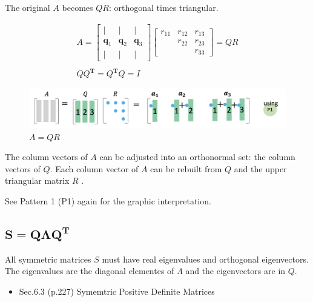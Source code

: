 \documentclass[letterpaper]{article}
\begin{document}
The original $A$ becomes $QR$: orthogonal times triangular.

\begin{gather*}
  A = 
  \begin{bmatrix}
    | & | & |\\
    \bm{q}_1 & \bm{q}_2 & \bm{q}_3\\
    | & | & |
  \end{bmatrix}
  \begin{bmatrix}
    r_{11} & r_{12} & r_{13}\\
           & r_{22} & r_{23}\\
           &        & r_{33}
  \end{bmatrix} = QR\\
  \\
  Q Q^\mathbf{T}=Q^\mathbf{T} Q = I
\end{gather*}

\begin{figure}[H]
  \includegraphics[keepaspectratio, width=\linewidth]{QR.png}
  \caption{$A=QR$}
\end{figure}

The column vectors of $A$ can be adjusted into an orthonormal set: the column vectors of $Q$.
Each column vector of $A$ can be rebuilt from $Q$ and the upper triangular matrix $R$ .

See Pattern 1 (P1) again for the graphic interpretation.


\clearpage

\subsection{$\boldsymbol{S=Q \Lambda Q^\mathbf{T}}$}

All symmetric matrices $S$ must have real eigenvalues and orthogonal eigenvectors.
The eigenvalues are the diagonal elementes of $\Lambda$ and the eigenvectors are in $Q$. 

\begin{itemize}
  \item Sec.6.3 (p.227) Symemtric Positive Definite Matrices
\end{itemize}
\end{document}
